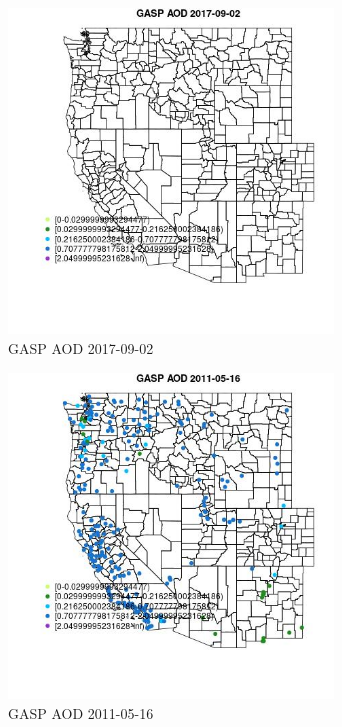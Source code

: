 \begin{figure} 
\centering  
\includegraphics[width=0.77\textwidth]{Code_Outputs/Report_ML_input_PM25_Step4_part_e_de_duplicated_aves_compiled_2019-05-21wNAs_MapObsGASP_AOD2017-09-02.jpg} 
\caption{\label{fig:Report_ML_input_PM25_Step4_part_e_de_duplicated_aves_compiled_2019-05-21wNAsMapObsGASP_AOD2017-09-02}GASP AOD 2017-09-02} 
\end{figure} 
 

\begin{figure} 
\centering  
\includegraphics[width=0.77\textwidth]{Code_Outputs/Report_ML_input_PM25_Step4_part_e_de_duplicated_aves_compiled_2019-05-21wNAs_MapObsGASP_AOD2011-05-16.jpg} 
\caption{\label{fig:Report_ML_input_PM25_Step4_part_e_de_duplicated_aves_compiled_2019-05-21wNAsMapObsGASP_AOD2011-05-16}GASP AOD 2011-05-16} 
\end{figure} 
 

